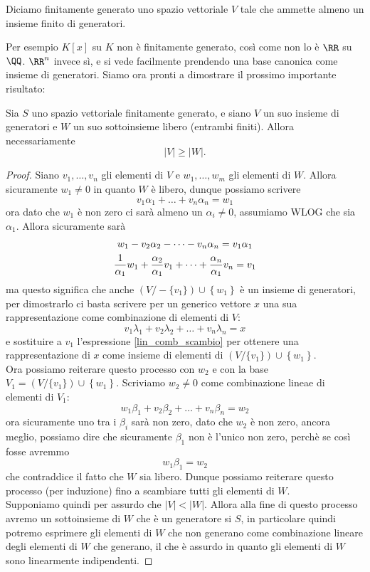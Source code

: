\documentclass[11pt]{scrartcl}
\begin{document}
	\begin{definition}
		Diciamo finitamente generato uno spazio vettoriale $V$ tale che ammette almeno un insieme finito di generatori. 
	\end{definition}
	Per esempio $K[x]$ su $K$ non è finitamente generato, così come non lo è $\RR$ su $\QQ$. $\RR^n$ invece sì, e si vede facilmente prendendo una base canonica come insieme di generatori. Siamo ora pronti a dimostrare il prossimo importante risultato:
	\begin{theorem}
		Sia $S$ uno spazio vettoriale finitamente generato, e siano $V$ un suo insieme di generatori e $W$ un suo sottoinsieme libero (entrambi finiti). Allora necessariamente $$|V|	\ge |W|.$$
	\end{theorem}
	\begin{proof}
		Siano $v_1,\dots,v_n$ gli elementi di $V$ e $w_1,\dots,w_m$ gli elementi di $W$. Allora sicuramente $w_1\ne 0$ in quanto $W$ è libero, dunque possiamo scrivere 
		$$v_1\alpha_1+\dots+v_n\alpha_n=w_1$$
		ora dato che $w_1$ è non zero ci sarà almeno un $\alpha_i\ne 0$, assumiamo WLOG che sia $\alpha_1$. Allora sicuramente sarà
		\begin{gather}
			\notag w_1-v_2\alpha_2-\dots-v_n\alpha_n=v_1\alpha_1 \\
			\label{lin_comb_scambio} \frac{1}{\alpha_1}w_1+\frac{\alpha_2}{\alpha_1}v_1+\dots+\frac{\alpha_n}{\alpha_1}v_n=v_1
		\end{gather}
		ma questo significa che anche $(V/-\{v_1\})\cup\left\{w_1\right\}$ è un insieme di generatori, per dimostrarlo ci basta scrivere per un generico vettore $x$ una sua rappresentazione come combinazione di elementi di $V$:
		$$v_1\lambda_1+v_2\lambda_2+\dots+v_n\lambda_n=x$$
		e sostituire a $v_1$ l'espressione \ref{lin_comb_scambio} per ottenere una rappresentazione di $x$ come insieme di elementi di $(V/\{v_1\})\cup\left\{w_1\right\}$. \\
		Ora possiamo reiterare questo processo con $w_2$ e con la base $V_1=(V/\{v_1\})\cup\left\{w_1\right\}$. Scriviamo $w_2\ne 0$ come combinazione lineae di elementi di $V_1$:
		$$w_1\beta_1+v_2\beta_2+\dots+v_n\beta_n=w_2$$
		ora sicuramente uno tra i $\beta_i$ sarà non zero, dato che $w_2$ è non zero, ancora meglio, possiamo dire che sicuramente $\beta_1$ non è l'unico non zero, perchè se così fosse avremmo
		$$w_1\beta_1=w_2$$
		che contraddice il fatto che $W$ sia libero. Dunque possiamo reiterare questo processo (per induzione) fino a scambiare tutti gli elementi di $W$. \\
		Supponiamo quindi per assurdo che $|V|<|W|$. Allora alla fine di questo processo avremo un sottoinsieme di $W$ che è un generatore si $S$, in particolare quindi potremo esprimere gli elementi di $W$ che non generano come combinazione lineare degli elementi di $W$ che generano, il che è assurdo in quanto gli elementi di $W$ sono linearmente indipendenti.
	\end{proof}
\end{document}
